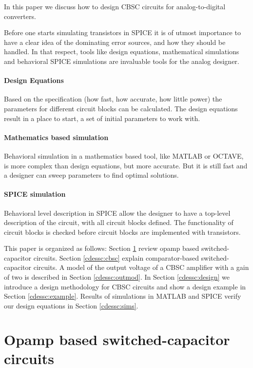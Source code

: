 In this paper we discuss how to design CBSC circuits for
analog-to-digital converters. 

Before one starts simulating transistors in SPICE it is of utmost
importance to have a clear idea of the dominating error sources, and
how they should be handled. In that respect, tools like design
equations, mathematical simulations and behavioral SPICE simulations
are invaluable tools for the analog designer.

\paragraph{Design Equations}
 Based on the specification (how fast, how accurate, how
    little power) the parameters for different circuit blocks can be
    calculated. The design equations result in a place to start, a set of
    initial parameters to work with. 
\paragraph{Mathematics based simulation}
 Behavioral
  simulation in a mathematics based tool, like MATLAB or
  OCTAVE, is more complex than design equations, but more
  accurate. But it is still fast and a designer can sweep parameters
  to find optimal solutions.
\paragraph{SPICE simulation}
Behavioral level description in SPICE allow the designer to have a
top-level description of the circuit, with all circuit blocks defined.   
The functionality of circuit blocks is checked before circuit blocks
 are implemented with transistors. 

This paper is organized as follows: Section \ref{cdessc:opamp} review opamp based
switched-capacitor circuits. Section \ref{cdessc:cbsc} explain
comparator-based switched-capacitor circuits. A model of the output
voltage of a CBSC amplifier with a gain of two is described in Section
\ref{cdessc:outmod}. In Section \ref{cdessc:design}
we introduce a design methodology for CBSC circuits and show a design
example in Section \ref{cdessc:example}. Results of
simulations in MATLAB and SPICE verify our design equations in Section \ref{cdessc:sims}.


\section{Opamp based switched-capacitor circuits} \label{cdessc:opamp}

